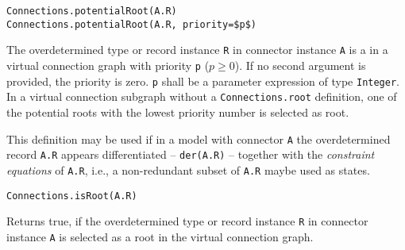 \begin{operatordefinition}
\begin{synopsis}\begin{lstlisting}
Connections.potentialRoot(A.R)
Connections.potentialRoot(A.R, priority=$p$)
\end{lstlisting}\end{synopsis}
\begin{semantics}
The overdetermined type or record instance \lstinline!R! in connector instance \lstinline!A! is a  in a virtual connection graph with priority \lstinline!p! ($p \geq 0$).
If no second argument is provided, the priority is zero.
\lstinline!p! shall be a parameter expression of type \lstinline!Integer!.
In a virtual connection subgraph without a \lstinline!Connections.root! definition, one of the potential roots with the lowest priority number is selected as root.

\begin{nonnormative}
This definition may be used if in a model with connector \lstinline!A! the overdetermined record \lstinline!A.R! appears differentiated -- \lstinline!der(A.R)! -- together with the \emph{constraint equations} of \lstinline!A.R!, i.e., a non-redundant subset of \lstinline!A.R! maybe used as states.
\end{nonnormative}
\end{semantics}
\end{operatordefinition}

\begin{operatordefinition}
\begin{synopsis}\begin{lstlisting}
Connections.isRoot(A.R)
\end{lstlisting}\end{synopsis}
\begin{semantics}
Returns true, if the overdetermined type or record instance \lstinline!R! in connector instance \lstinline!A! is selected as a root in the virtual connection graph.
\end{semantics}
\end{operatordefinition}

